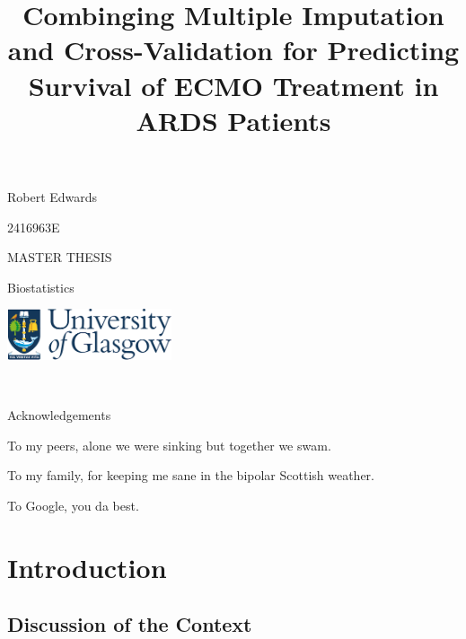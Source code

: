 \documentclass[12pt,]{article}
\title{Combinging Multiple Imputation and Cross-Validation for Predicting
Survival of ECMO Treatment in ARDS Patients}
\author{}
\date{}
\begin{document}
\maketitle

\vspace{2cm}

\begin{center}
Robert Edwards 

\vspace{0.125cm}
2416963E


\vspace{1cm}
MASTER THESIS 

\vspace{0.125cm}
Biostatistics

\vspace{10cm}
  \includegraphics[height = 1.5cm]{images/GUlogo.png}
\end{center}

\newpage

\begin{center}
~
 
\vspace{5cm}
Acknowledgements 

\vspace{3cm}
To my peers, alone we were sinking but together we swam.

\vspace{1cm}
To my family, for keeping me sane in the bipolar Scottish weather. 

\vspace{1cm}
To Google, you da best. 

\end{center}

\newpage 

\setcounter{tocdepth}{2} \tableofcontents  

\newpage

\section{Introduction}\label{introduction}

\subsection{Discussion of the Context}\label{discussion-of-the-context}
\end{document}
